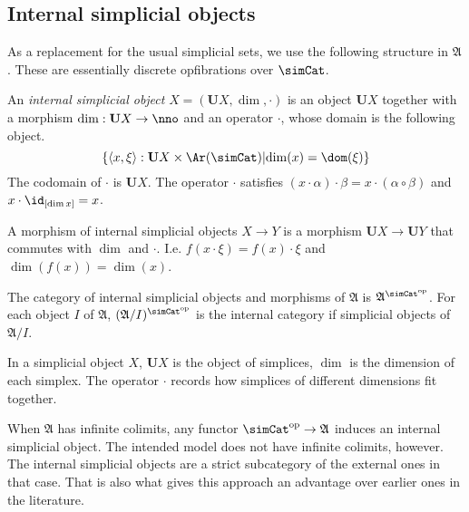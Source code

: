 \documentclass{tac}
\newcommand\hide[1]{}
\newcommand\set[1]{\left\{#1\right\}}
\newcommand\dual{^{\mathrm{op}}}
\newcommand\s{^{\simCat\dual}}
\newcommand\of{:}
\newcommand\tuplet[1]{\left\langle #1 \right\rangle}
\newcommand\ambient{\mathfrak A}
\begin{document}
\subsection{Internal simplicial objects}%
As a replacement for the usual simplicial sets, we use the following structure in $\ambient$. These are essentially discrete opfibrations over $\simCat$.

\newcommand\base{\mathbf{U}}
\begin{definition} An \emph{internal simplicial object} $X=(\base X,\dim,\cdot)$ is an object $\base X$ together with a morphism $\dim\of \base X\to\nno$ and an operator $\cdot$, whose domain is the following object.
\[ \set{\tuplet{x,\xi}\of \base X\times\Ar(\simCat)\middle| \dim (x)=\dom(\xi)} \]
The codomain of $\cdot$ is $\base X$. The operator $\cdot$ satisfies $(x\cdot\alpha)\cdot\beta=x\cdot(\alpha\circ\beta)$ and $x\cdot\id_{[\dim x]}=x$.  

A morphism of internal simplicial objects $X\to Y$ is a morphism $\base X\to \base Y$ that commutes with $\dim$ and $\cdot$. I.e. $f(x\cdot \xi)=f(x)\cdot\xi$ and $\dim(f(x))=\dim(x)$.

The category of internal simplicial objects and morphisms of $\ambient$ is $\ambient\s$. For each object $I$ of $\ambient$, $(\ambient/I)\s$ is the internal category if simplicial objects of $\ambient/I$.
\end{definition}\hide{ Is it feasible to rewrite the whole paper with these?}

In a simplicial object $X$, $\base X$ is the object of simplices, $\dim$ is the dimension of each simplex. The operator $\cdot$ records how simplices of different dimensions fit together. 

\begin{remark} When $\ambient$ has infinite colimits, any functor $\simCat\dual\to\ambient$ induces an internal simplicial object. The intended model does not have infinite colimits, however. The internal simplicial objects are a strict subcategory of the external ones in that case. That is also what gives this approach an advantage over earlier ones in the literature.%
\end{remark}

\hide{
\subsection{Families}
\begin{defin}
For each object $I$ of $\ambient$ the category $\ambient/I\s$ of simplicial objects in the slice $\ambient/I$ is an \emph{$I$-indexed families of simplicial objects}. 
\end{defin}

Is there anything to prove here?

Other thought: maybe treat the equivalence of $\ambient\s/J$ with $\ambient^{EJ}\s$ here, with $EJ$ the category of elements of the simplicial set $J$.

}
\end{document}
